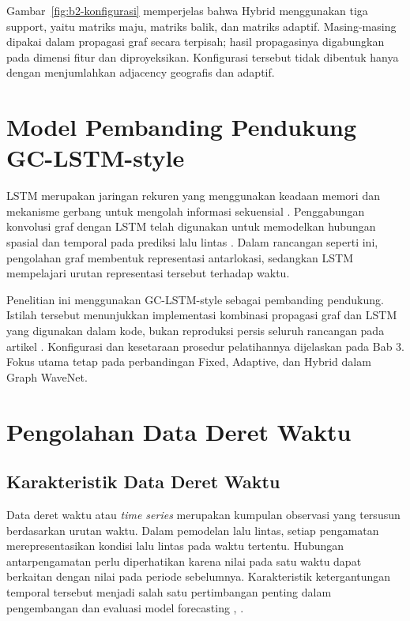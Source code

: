 Gambar~\ref{fig:b2-konfigurasi} memperjelas bahwa Hybrid menggunakan tiga support, yaitu matriks maju, matriks balik, dan matriks adaptif. Masing-masing dipakai dalam propagasi graf secara terpisah; hasil propagasinya digabungkan pada dimensi fitur dan diproyeksikan. Konfigurasi tersebut tidak dibentuk hanya dengan menjumlahkan adjacency geografis dan adaptif.


\section{Model Pembanding Pendukung GC-LSTM-style}
\label{sec:gclstm}

LSTM merupakan jaringan rekuren yang menggunakan keadaan memori dan mekanisme gerbang untuk mengolah informasi sekuensial \cite{hochreiter1997lstm}. Penggabungan konvolusi graf dengan LSTM telah digunakan untuk memodelkan hubungan spasial dan temporal pada prediksi lalu lintas \cite{bogaerts2020graphcnn}. Dalam rancangan seperti ini, pengolahan graf membentuk representasi antarlokasi, sedangkan LSTM mempelajari urutan representasi tersebut terhadap waktu.

Penelitian ini menggunakan GC-LSTM-style sebagai pembanding pendukung. Istilah tersebut menunjukkan implementasi kombinasi propagasi graf dan LSTM yang digunakan dalam kode, bukan reproduksi persis seluruh rancangan pada artikel \cite{bogaerts2020graphcnn}. Konfigurasi dan kesetaraan prosedur pelatihannya dijelaskan pada Bab 3. Fokus utama tetap pada perbandingan Fixed, Adaptive, dan Hybrid dalam Graph WaveNet.

\section{Pengolahan Data Deret Waktu}

\subsection{Karakteristik Data Deret Waktu}

Data deret waktu atau \textit{time series} merupakan kumpulan observasi yang tersusun berdasarkan urutan waktu. Dalam pemodelan lalu lintas, setiap pengamatan merepresentasikan kondisi lalu lintas pada waktu tertentu. Hubungan antarpengamatan perlu diperhatikan karena nilai pada satu waktu dapat berkaitan dengan nilai pada periode sebelumnya. Karakteristik ketergantungan temporal tersebut menjadi salah satu pertimbangan penting dalam pengembangan dan evaluasi model forecasting \cite{jiang2022gnntraffic}, \cite{cerqueira2020evaluation}.

